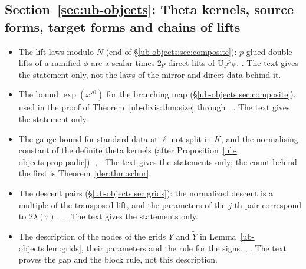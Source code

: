 \subsection*{Section~\ref{sec:ub-objects}: Theta kernels, source forms, target forms and chains of lifts}
\begin{itemize}[leftmargin=2em,itemsep=1pt]
\item The lift laws modulo $N$ (end of \S\ref{ub-objects:sec:composite}): $p$ glued double lifts of
  a ramified $\phi$ are a scalar times $2p$ direct lifts of $\mathrm{Up}^p\phi$.
  . The text gives the statement only, not the laws
  of the mirror and direct data behind it.
\item The bound $\exp(x^{70})$ for the branching map (\S\ref{ub-objects:sec:composite}), used in the
  proof of Theorem~\ref{ub-divis:thm:size} through .
  . The text gives the statement only.
\item The gauge bound for standard data at $\ell$ not split in $K$, and the normalising constant of the
  definite theta kernels (after Proposition~\ref{ub-objects:prop:padic}).
  , .
  The text gives the statements only; the count behind the first is Theorem~\ref{der:thm:schur}.
\item The descent pairs (\S\ref{ub-objects:sec:grids}): the normalized descent is a multiple of the
  transposed lift, and the parameters of the $j$-th pair correspond to $2\lambda(\tau)$.
  , .
  The text gives the statements only.
\item The description of the nodes of the grids $Y$ and $\tilde Y$ in
  Lemma~\ref{ub-objects:lem:grids}, their parameters and the rule for the signs.
  , . The text
  proves the gap and the block rule, not this description.
\end{itemize}

